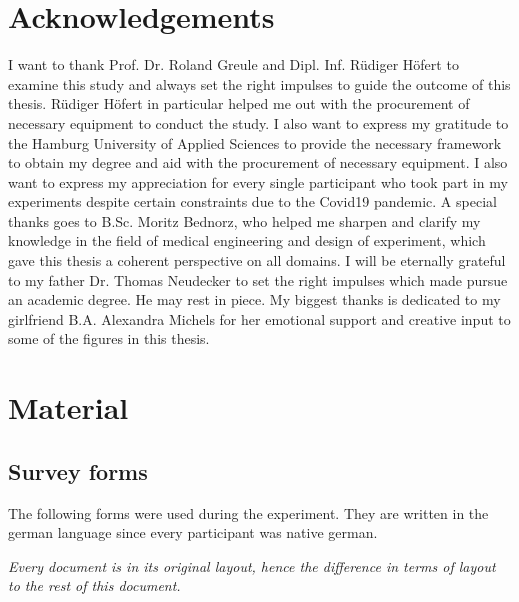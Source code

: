     \chapter{Acknowledgements}

        I want to thank Prof. Dr. Roland Greule and Dipl. Inf. Rüdiger Höfert to examine this study and always set the right impulses to guide the outcome of this thesis. Rüdiger Höfert in particular helped me out with the procurement of necessary equipment to conduct the study. I also want to express my gratitude to the Hamburg University of Applied Sciences to provide the necessary framework to obtain my degree and aid with the procurement of necessary equipment. I also want to express my appreciation for every single participant who took part in my experiments despite certain constraints due to the Covid19 pandemic.
        A special thanks goes to B.Sc. Moritz Bednorz, who helped me sharpen and clarify my knowledge in the field of medical engineering and design of experiment, which gave this thesis a coherent perspective on all domains. 
        I will be eternally grateful to my father Dr. Thomas Neudecker to set the right impulses which made pursue an academic degree. He may rest in piece. 
        My biggest thanks is dedicated to my girlfriend B.A. Alexandra Michels for her emotional support and creative input to some of the figures in this thesis.

    \appendix

        \chapter{Material}

            \section{Survey forms}\label{surveys}

                The following forms were used during the experiment. They are written in the german language since every participant was native german. 

                \medskip

                \textit{Every document is in its original layout, hence the difference in terms of layout to the rest of this document.}


                \label{consent}
                \label{q-prior}
                \label{q-post}

